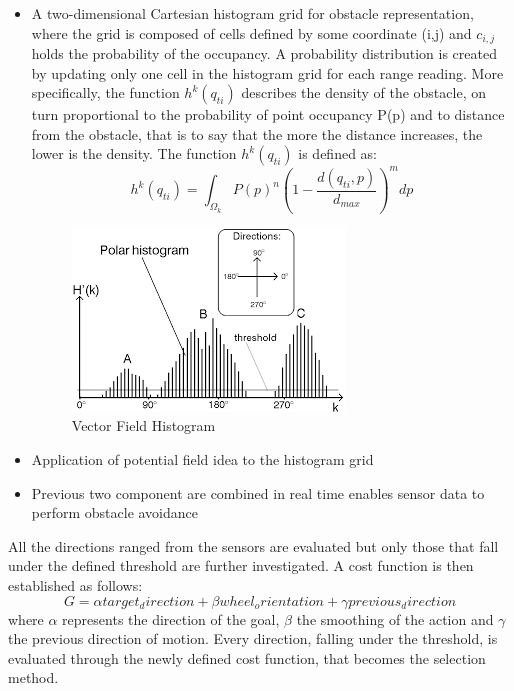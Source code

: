 \begin{itemize}
    \item A two-dimensional Cartesian histogram grid for obstacle representation, where the grid is composed of cells defined by some coordinate (i,j) and $c_{i,j}$ holds the probability of the occupancy. A probability distribution is created by updating only one cell in the histogram grid for each range reading.
    More specifically, the function $h^k(q_{ti})$ describes the density of the obstacle, on turn proportional to the probability of point occupancy P(p) and to distance from the obstacle, that is to say that the more the distance increases, the lower is the density.
    The function $h^k(q_{ti})$ is defined as:
    \begin{equation}
        h^k(q_{ti}) = \int_{\Omega_k} P(p)^n\left(1 - \frac{d(q_{ti},p)}{d_{max}}\right)^m dp
    \end{equation}
    \begin{figure}[H]
        \centering
        \includegraphics{Images/Chapter 4/potentialfield.png}
        \caption{Vector Field Histogram}
        \label{fig:my_label}
    \end{figure}
    \item Application of potential field idea to the histogram grid
    \item Previous two component are combined in real time enables sensor data to perform obstacle avoidance
\end{itemize}
All the directions ranged from the sensors are evaluated but only those that fall under the defined threshold are further investigated. A cost function is then established as follows:
\begin{equation}
    G = \alpha target_ direction + \beta wheel_ orientation + \gamma previous_ direction
\end{equation}
where $\alpha$ represents the direction of the goal, $\beta$ the smoothing of the action and $\gamma$ the previous direction of motion.
Every direction, falling under the threshold, is evaluated through the newly defined cost function, that becomes the selection method.

